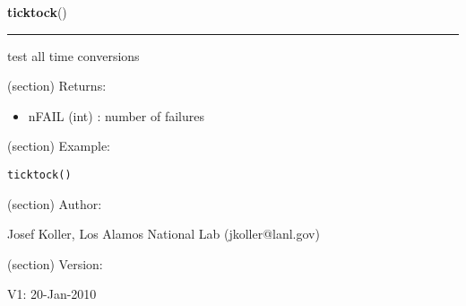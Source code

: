 \hspace{.8\funcindent}\begin{boxedminipage}{\funcwidth}

    \raggedright \textbf{ticktock}()

    \vspace{-1.5ex}

    \rule{\textwidth}{0.5\fboxrule}
\setlength{\parskip}{2ex}
    test all time conversions

    (section) Returns:

      \begin{itemize}
      \setlength{\parskip}{0.6ex}
        \item nFAIL (int) : number of failures

      \end{itemize}

    (section) Example:

\begin{alltt}
\pysrcprompt{{\textgreater}{\textgreater}{\textgreater} }ticktock()
\end{alltt}
    (section) Author:

      Josef Koller, Los Alamos National Lab (jkoller@lanl.gov)

    (section) Version:

      V1: 20-Jan-2010

\setlength{\parskip}{1ex}
    \end{boxedminipage}

    \label{spacepy:testing:toolbox}

    \vspace{0.5ex}

